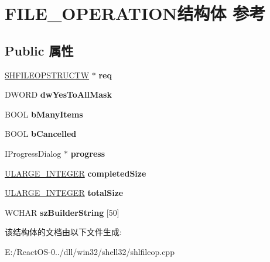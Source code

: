 \hypertarget{struct_f_i_l_e___o_p_e_r_a_t_i_o_n}{}\section{F\+I\+L\+E\+\_\+\+O\+P\+E\+R\+A\+T\+I\+O\+N结构体 参考}
\label{struct_f_i_l_e___o_p_e_r_a_t_i_o_n}
\subsection*{Public 属性}
\begin{DoxyCompactItemize}
\item 
\mbox{\label{struct_f_i_l_e___o_p_e_r_a_t_i_o_n_a10dcf1179b273ef5f0699ffad18f344b}} 
\hyperlink{struct___s_h_f_i_l_e_o_p_s_t_r_u_c_t_w}{S\+H\+F\+I\+L\+E\+O\+P\+S\+T\+R\+U\+C\+TW} $\ast$ {\bfseries req}
\item 
\mbox{\label{struct_f_i_l_e___o_p_e_r_a_t_i_o_n_a3e3cd7e96bf88d250640346c5d0d4b18}} 
D\+W\+O\+RD {\bfseries dw\+Yes\+To\+All\+Mask}
\item 
\mbox{\label{struct_f_i_l_e___o_p_e_r_a_t_i_o_n_aee1130adbcbf545624a0030f60127f14}} 
B\+O\+OL {\bfseries b\+Many\+Items}
\item 
\mbox{\label{struct_f_i_l_e___o_p_e_r_a_t_i_o_n_a3ff5761682b7333ce79bdb29f006e045}} 
B\+O\+OL {\bfseries b\+Cancelled}
\item 
\mbox{\label{struct_f_i_l_e___o_p_e_r_a_t_i_o_n_a424ea26faa4586e4d6438f15573661a9}} 
I\+Progress\+Dialog $\ast$ {\bfseries progress}
\item 
\mbox{\label{struct_f_i_l_e___o_p_e_r_a_t_i_o_n_a4987e95d40caef0397ae06c85f22f45b}} 
\hyperlink{struct___u_l_a_r_g_e___i_n_t_e_g_e_r}{U\+L\+A\+R\+G\+E\+\_\+\+I\+N\+T\+E\+G\+ER} {\bfseries completed\+Size}
\item 
\mbox{\label{struct_f_i_l_e___o_p_e_r_a_t_i_o_n_a457980817c1b17d0fde7762a3aecbf67}} 
\hyperlink{struct___u_l_a_r_g_e___i_n_t_e_g_e_r}{U\+L\+A\+R\+G\+E\+\_\+\+I\+N\+T\+E\+G\+ER} {\bfseries total\+Size}
\item 
\mbox{\label{struct_f_i_l_e___o_p_e_r_a_t_i_o_n_ab18bfb8306b666e36d4e23c34c2900fb}} 
W\+C\+H\+AR {\bfseries sz\+Builder\+String} \mbox{[}50\mbox{]}
\end{DoxyCompactItemize}


该结构体的文档由以下文件生成\+:\begin{DoxyCompactItemize}
\item 
E\+:/\+React\+O\+S-\/0../dll/win32/shell32/shlfileop.\+cpp\end{DoxyCompactItemize}
